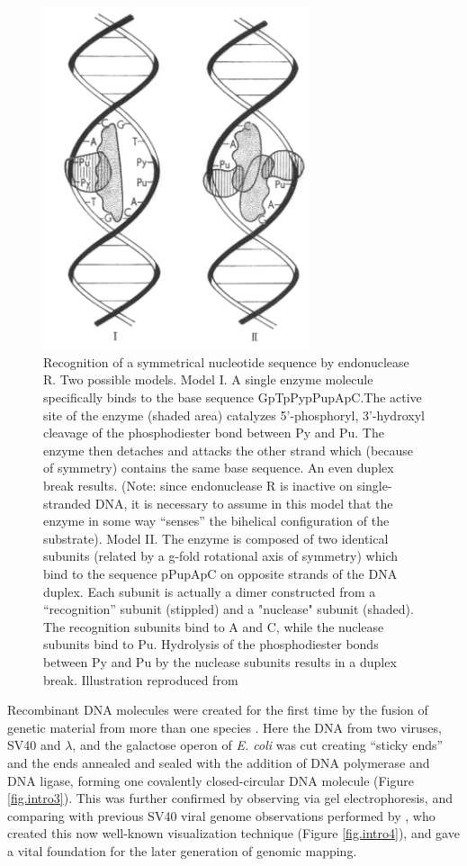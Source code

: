 \begin{figure}[!ht]
  \centering
  \includegraphics[width=0.7\textwidth]{introduction/chapter/figs/dnase.png}
  \caption{Recognition of a symmetrical nucleotide sequence by endonuclease R. Two possible models. Model I. A single enzyme molecule specifically binds to the base sequence GpTpPypPupApC.The active site of the enzyme (shaded area) catalyzes 5’-phosphoryl, 3’-hydroxyl cleavage of the phosphodiester bond between Py and Pu. The enzyme then detaches and attacks the other strand which (because of symmetry) contains the same base sequence. An even duplex break results. (Note: since endonuclease R is inactive on single-stranded DNA, it is necessary to assume in this model that the enzyme in some way “senses” the bihelical configuration of the substrate). 
  Model II. The enzyme is composed of two identical subunits (related by a g-fold rotational axis of symmetry) which bind to the sequence pPupApC on opposite strands of the DNA duplex. Each subunit is actually a dimer constructed from a “recognition” subunit (stippled) and a "nuclease" subunit (shaded). The recognition subunits bind to A and C, while the nuclease subunits bind to Pu. Hydrolysis of the phosphodiester bonds between Py and Pu by the nuclease subunits results in a duplex break. Illustration reproduced from \citet{kelly1970restriction}}
  \label{fig.intro2}
\end{figure}

Recombinant DNA molecules were created for the first time by the fusion of genetic material from more than one species \citep{jackson1972biochemical}. Here the DNA from two viruses, SV40 and $\lambda$, and the galactose operon of \textit{E. coli}  was cut creating “sticky ends” and the ends annealed and sealed with the addition of DNA polymerase and DNA ligase, forming one covalently closed-circular DNA molecule (Figure \ref{fig.intro3}). This was further confirmed by observing via gel electrophoresis, and comparing with previous SV40 viral genome observations performed by \citet{danna1971specific}, who created this now well-known visualization technique (Figure \ref{fig.intro4}), and gave a vital foundation for the later generation of genomic mapping.

